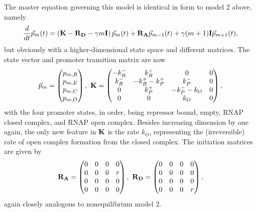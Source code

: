 The master equation governing this model is identical in form to model 2 above,
namely
\begin{equation}
\frac{d {}}{d t}\vec{p}_m(t) =
\left( \mathbf{K} - \mathbf{R_D} - \gamma m \mathbf{I} \right) \vec{p}_m(t)
                + \mathbf{R_A} \vec{p}_{m-1}(t) +
                \gamma (m+1) \mathbf{I} \vec{p}_{m+1}(t),
\end{equation}
but obviously with a higher-dimensional state space and different matrices. The
state vector and promoter transition matrix are now
\begin{equation}
\vec{p}_m = \begin{pmatrix} p_{m,R} \\ p_{m,E} \\
                             p_{m,C} \\ p_{m,O}\end{pmatrix},\
\mathbf{K} = \begin{pmatrix} -k_R^- & k_R^+ & 0 & 0\\
                        k_R^- & -k_R^+ -k_P^+ & k_P^- & 0 \\
                        0 & k_P^+ & -k_P^- - k_O & 0 \\
                        0 & 0 & k_O & 0
                \end{pmatrix},
\end{equation}
with the four promoter states, in order, being repressor bound, empty, RNAP
closed complex, and RNAP open complex. Besides increasing dimension by one
again, the only new feature in $\mathbf{K}$ is the rate $k_O$, representing the
(irreversible) rate of open complex formation from the closed complex. The
initiation matrices are given by
\begin{equation}
\mathbf{R_A} = \begin{pmatrix}
        0 & 0 & 0 & 0 \\ 0 & 0 & 0 & r \\ 0 & 0 & 0 & 0\\ 0 & 0 & 0 & 0
                \end{pmatrix},\
\mathbf{R_D} = \begin{pmatrix}
        0 & 0 & 0 & 0 \\ 0 & 0 & 0 & 0 \\ 0 & 0 & 0 & 0\\ 0 & 0 & 0 & r
                \end{pmatrix},
\end{equation}
again closely analogous to nonequilibrium model 2.

